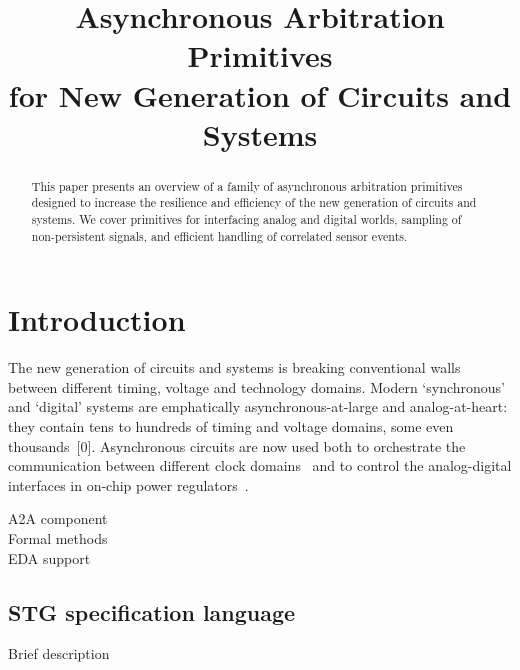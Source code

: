 \documentclass[conference]{IEEEtran}
\begin{document}
\title{Asynchronous Arbitration Primitives\\for New Generation of Circuits and Systems}

\author{
}

\maketitle

\begin{abstract}
This paper presents an overview of a family of asynchronous arbitration
primitives designed to increase the resilience and efficiency of
the new generation of circuits and systems. We cover primitives for
interfacing analog and digital worlds, sampling of non-persistent
signals, and efficient handling of correlated sensor events.
\end{abstract}


\section{Introduction}

The new generation of circuits and systems is breaking conventional walls between
different timing, voltage and technology domains. Modern `synchronous' and `digital'
systems are emphatically asynchronous-at-large and analog-at-heart: they contain tens
to hundreds of timing and voltage domains, some even thousands~[0]. Asynchronous
circuits are now used both to orchestrate the communication between different clock
domains~\cite{2017_jiang_noc} and to control the analog-digital interfaces in on-chip power
regulators~\cite{2017_sokolov_a4a}.

A2A component\\
Formal methods\\
EDA support\\

\subsection{STG specification language}

Brief description\\
\end{document}
